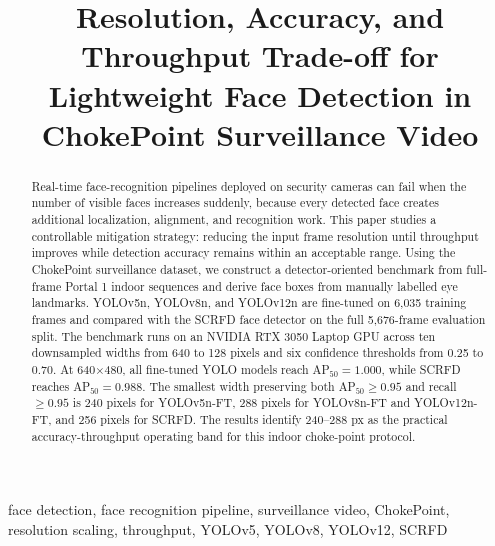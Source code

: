 \documentclass[conference]{IEEEtran}
\begin{document}
\title{Resolution, Accuracy, and Throughput Trade-off for Lightweight Face Detection in ChokePoint Surveillance Video}

\author{
\and
{}
}

\maketitle

\begin{abstract}
Real-time face-recognition pipelines deployed on security cameras can fail when the number of visible faces increases suddenly, because every detected face creates additional localization, alignment, and recognition work. This paper studies a controllable mitigation strategy: reducing the input frame resolution until throughput improves while detection accuracy remains within an acceptable range. Using the ChokePoint surveillance dataset, we construct a detector-oriented benchmark from full-frame Portal 1 indoor sequences and derive face boxes from manually labelled eye landmarks. YOLOv5n, YOLOv8n, and YOLOv12n are fine-tuned on 6,035 training frames and compared with the SCRFD face detector on the full 5,676-frame evaluation split. The benchmark runs on an NVIDIA RTX 3050 Laptop GPU across ten downsampled widths from 640 to 128 pixels and six confidence thresholds from 0.25 to 0.70. At 640$\times$480, all fine-tuned YOLO models reach AP$_{50}=1.000$, while SCRFD reaches AP$_{50}=0.988$. The smallest width preserving both AP$_{50}\geq0.95$ and recall $\geq0.95$ is 240 pixels for YOLOv5n-FT, 288 pixels for YOLOv8n-FT and YOLOv12n-FT, and 256 pixels for SCRFD. The results identify 240--288 px as the practical accuracy-throughput operating band for this indoor choke-point protocol.
\end{abstract}

\begin{IEEEkeywords}
face detection, face recognition pipeline, surveillance video, ChokePoint, resolution scaling, throughput, YOLOv5, YOLOv8, YOLOv12, SCRFD
\end{IEEEkeywords}
\end{document}
